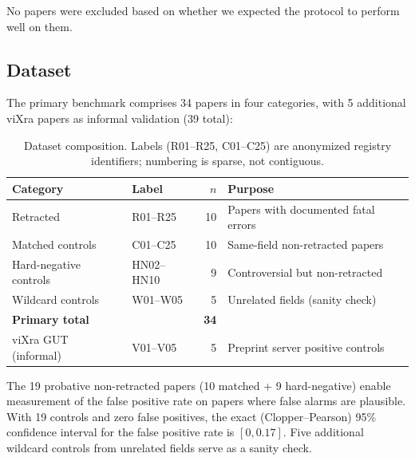 \documentclass[11pt]{article}
\begin{document}
No papers were excluded based on whether we expected the protocol to perform well on them.

\subsection{Dataset}

The primary benchmark comprises 34 papers in four categories, with 5 additional viXra papers as informal validation (39 total):

\begin{table}[h]
\centering
\caption{Dataset composition. Labels (R01--R25, C01--C25) are anonymized registry identifiers; numbering is sparse, not contiguous.}
\label{tab:dataset_composition}
\begin{tabular}{llrl}
\toprule
\textbf{Category} & \textbf{Label} & \textbf{$n$} & \textbf{Purpose} \\
\midrule
Retracted & R01--R25 & 10 & Papers with documented fatal errors \\
Matched controls & C01--C25 & 10 & Same-field non-retracted papers \\
Hard-negative controls & HN02--HN10 & 9 & Controversial but non-retracted \\
Wildcard controls & W01--W05 & 5 & Unrelated fields (sanity check) \\
\midrule
\textbf{Primary total} & & \textbf{34} & \\
\midrule
viXra GUT (informal) & V01--V05 & 5 & Preprint server positive controls \\
\bottomrule
\end{tabular}
\end{table}

The 19 probative non-retracted papers (10 matched + 9 hard-negative) enable measurement of the false positive rate on papers where false alarms are plausible. With 19 controls and zero false positives, the exact (Clopper--Pearson) 95\% confidence interval for the false positive rate is $[0, 0.17]$. Five additional wildcard controls from unrelated fields serve as a sanity check.
\end{document}
